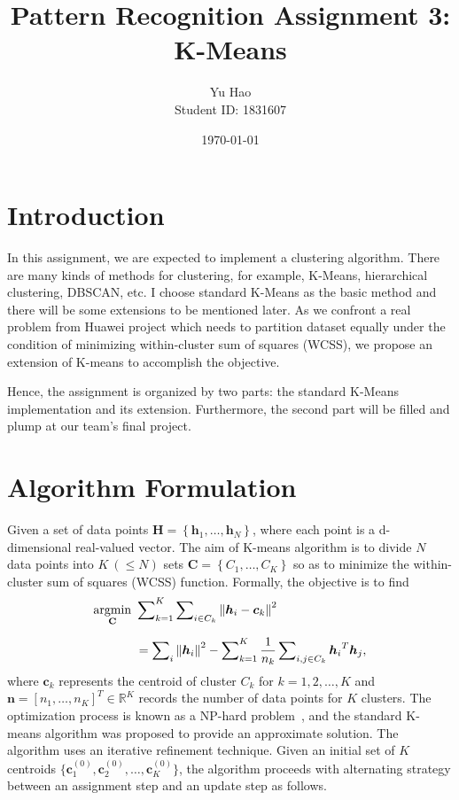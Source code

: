 \documentclass[12pt,a4paper]{article}
\title{Pattern Recognition Assignment 3: K-Means}
\author{Yu Hao\\[10pt] Student ID: 1831607}
\date{\today}
\newcommand{\norm}[1]{\left\lVert#1\right\rVert}
\begin{document}
\maketitle

\section{Introduction}
In this assignment, we are expected to implement a clustering algorithm. There are many kinds of methods for clustering, for example, K-Means, hierarchical clustering, DBSCAN, etc. I choose standard K-Means as the basic method and there will be some extensions to be mentioned later. As we confront a real problem from Huawei project which needs to partition dataset equally under the condition of minimizing within-cluster sum of squares (WCSS), we propose an extension of K-means to accomplish the objective.

Hence, the assignment is organized by two parts: the standard K-Means implementation and its extension. Furthermore, the second part will be filled and plump at our team's final project.
\section{Algorithm Formulation}
Given a set of data points $\mathbf{H}=\left \{ \bm{h}_{1},\ldots,\bm{h}_{N} \right \}$, where each point is a d-dimensional real-valued vector.
The aim of K-means algorithm is to divide $N$ data points into $K\ (\leqslant N)$ sets $\mathbf{C}=\left \{ \mathit{C}_{1},\ldots,\mathit{C}_{K} \right \}$
so as to minimize the within-cluster sum of squares (WCSS) function. Formally, the objective is to find
\begin{equation}
\begin{aligned}
\underset{\mathbf{C}}{\rm argmin}~&\sum\nolimits_{k=1}^{K}\sum\nolimits_{i\in C_{k}} \norm{ \bm{h}_{i}-\bm{c}_{k}}^{2}\\[6pt]
&=\sum\nolimits_i{ \norm{\bm{h}_i}^{2}} -\sum\nolimits_{k=1}^{K}\frac{1}{n_k}\sum\nolimits_{i,j\in C_{k}}{\bm{h}_{i}}^{T}\bm{h}_{j},
\end{aligned}
\end{equation}
where $\bm{c}_{k}$ represents the centroid of cluster $C_{k}$ for $k=1,2,\ldots,K$ and $\bm{n}={[n_{1},\ldots,n_{K}]}^{T}\in \mathbb{R}^{K}$ records the number of data points for $K$ clusters.
The optimization process is known as a NP-hard problem~\cite{garey1982complexity}, and the standard K-means algorithm  \cite{hartigan1975clustering} was proposed to provide an approximate solution. The algorithm uses an iterative refinement technique. Given an initial set of $K$ centroids $\{ \bm{c}_{1}^{(0)},\bm{c}_{2}^{(0)},\ldots,\bm{c}_{K}^{(0)}\}$, the algorithm proceeds with alternating strategy between an assignment step and an update step as follows.
\end{document}
